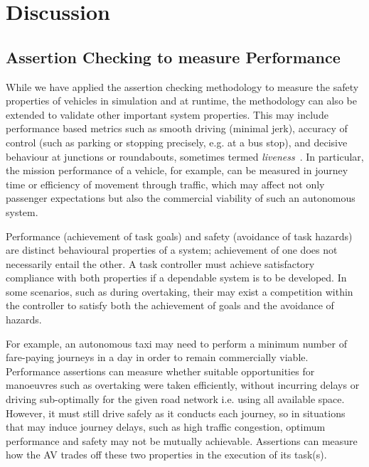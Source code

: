 \section{Discussion} \label{discussion}

\subsection{Assertion Checking to measure Performance}
While we have applied the assertion checking methodology to measure the safety properties of vehicles in simulation and at runtime, the methodology can also be extended to validate other important system properties. This may include performance based metrics such as smooth driving (minimal jerk), accuracy of control (such as parking or stopping precisely, e.g. at a bus stop), and decisive behaviour at junctions or roundabouts, sometimes termed \emph{liveness}~\cite{kim2014mpc}. In particular, the mission performance of a vehicle, for example, can be measured in journey time or efficiency of movement through traffic, which may affect not only passenger expectations but also the commercial viability of such an autonomous system. 

Performance (achievement of task goals) and safety (avoidance of task hazards) are distinct behavioural properties of a system; achievement of one does not necessarily entail the other. A task controller must achieve satisfactory compliance with both properties if a dependable system is to be developed. In some scenarios, such as during overtaking, their may exist a competition within the controller to satisfy both the achievement of goals and the avoidance of hazards. 

For example, an autonomous taxi may need to perform a minimum number of fare-paying journeys in a day in order to remain commercially viable. Performance assertions can measure whether suitable opportunities for manoeuvres such as overtaking were taken efficiently, without incurring delays or driving sub-optimally for the given road network i.e. using all available space. However, it must still drive safely as it conducts each journey, so in situations that may induce journey delays, such as high traffic congestion, optimum performance and safety may not be mutually achievable. Assertions can measure how the AV trades off these two properties in the execution of its task(s).

